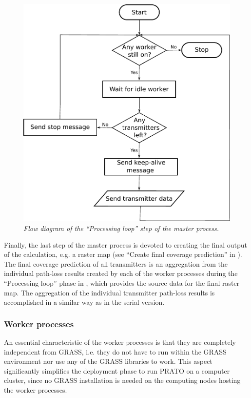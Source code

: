 \begin{figure}
\centering

\includegraphics[width=0.85\columnwidth]{04-framework_design_and_implementation/img/master_processing_loop_flow_diagram}

\caption{\textit{\emph{Flow diagram of the ``Processing loop'' step of the
master process.\label{fig:processing_loop_in_master_process}}}}
\end{figure}


Finally, the last step of the master process is devoted to creating
the final output of the calculation, e.g. a raster map (see ``Create
final coverage prediction'' in ).
The final coverage prediction of all transmitters is an aggregation
from the individual path-loss results created by each of the worker
processes during the ``Processing loop'' phase in ,
which provides the source data for the final raster map. The aggregation
of the individual transmitter path-loss results is accomplished in
a similar way as in the serial version.


\subsubsection{Worker processes}

An essential characteristic of the worker processes is that they are
completely independent from GRASS, i.e. they do not have to run within
the GRASS environment nor use any of the GRASS libraries to work.
This aspect significantly simplifies the deployment phase to run PRATO
on a computer cluster, since no GRASS installation is needed on the
computing nodes hosting the worker processes.

